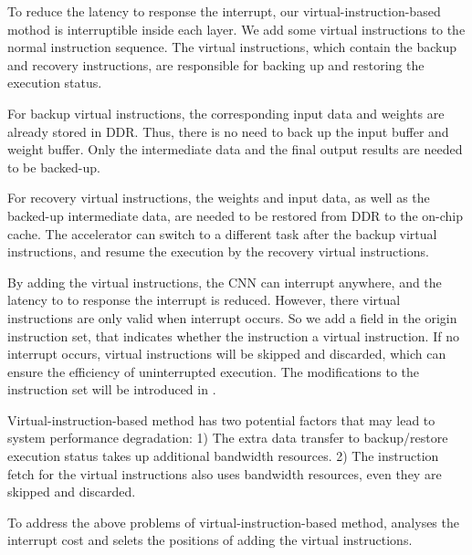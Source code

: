 To reduce the latency to response the interrupt, our virtual-instruction-based mothod is interruptible inside each layer. We add some virtual instructions to the normal instruction sequence.
The virtual instructions, which contain the backup and recovery instructions, are responsible for backing up and restoring the execution status. 

For backup virtual instructions, the corresponding input data and weights are already stored in DDR. 
Thus, there is no need to back up the input buffer and weight buffer. Only the intermediate data and the final output results are needed to be backed-up. 

For recovery virtual instructions, the weights and input data, as well as the backed-up intermediate data, are needed to be restored from DDR to the on-chip cache.
The accelerator can switch to a different task after the backup virtual instructions, and resume the execution by the recovery virtual instructions.

By adding the virtual instructions, the CNN can interrupt anywhere, and the latency to to response the interrupt is reduced. However, there virtual instructions are only valid when interrupt occurs. So we add a field in the origin instruction set, that indicates whether the instruction a virtual instruction. If no interrupt occurs, virtual instructions will be skipped and discarded, which can ensure the efficiency of uninterrupted execution. The modifications to the instruction set will be introduced in . 

Virtual-instruction-based method has two potential factors that may lead to system performance degradation: 1) The extra data transfer to backup/restore execution status takes up additional bandwidth resources. 2) The instruction fetch for the virtual instructions also uses bandwidth resources, even they are skipped and discarded.

To address the above problems of virtual-instruction-based method,  analyses the interrupt cost and selets the positions of adding the virtual instructions.


